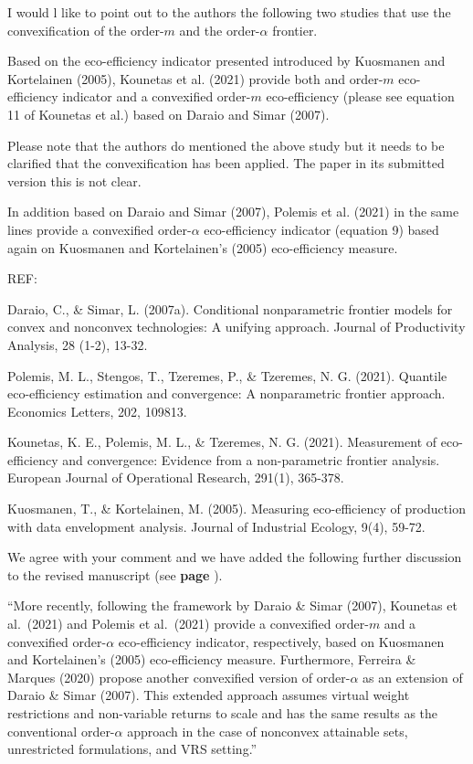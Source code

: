 \documentclass[12pt]{article}
\newcommand{\np}{\vskip 0.3cm}
\begin{document}
\np
\np
\np
\begin{sf}
{\blueb
I would l like to point out to the authors the following two studies that use the convexification of the order-$m$ and the order-$\alpha$ frontier.\np

Based on the eco-efficiency indicator presented introduced by Kuosmanen and Kortelainen (2005), Kounetas et al. (2021) provide both and order-$m$ eco-efficiency indicator and a convexified order-$m$ eco-efficiency (please see equation 11 of Kounetas et al.) based on  Daraio and Simar (2007).\np

Please note that the authors do mentioned the above study but it needs to be clarified that the convexification has been applied. The paper in its submitted version this is not clear.\np

In addition based on  Daraio and Simar (2007), Polemis et al. (2021) in the same lines provide a convexified order-$\alpha$ eco-efficiency indicator (equation 9) based again on Kuosmanen and Kortelainen's (2005) eco-efficiency measure. \np

REF:

Daraio, C., \& Simar, L. (2007a). Conditional nonparametric frontier models for convex and nonconvex technologies: A unifying approach. Journal of Productivity Analysis, 28 (1-2), 13-32.\np

Polemis, M. L., Stengos, T., Tzeremes, P., \& Tzeremes, N. G. (2021). Quantile eco-efficiency estimation and convergence: A nonparametric frontier approach. Economics Letters, 202, 109813.\np

Kounetas, K. E., Polemis, M. L., \& Tzeremes, N. G. (2021). Measurement of eco-efficiency and convergence: Evidence from a non-parametric frontier analysis. European Journal of Operational Research, 291(1), 365-378.\np

Kuosmanen, T., \& Kortelainen, M. (2005). Measuring eco-efficiency of production with data envelopment analysis. Journal of Industrial Ecology, 9(4), 59-72.}
\end{sf}
\begin{response}
We agree with your comment and we have added the following further discussion to the revised manuscript (see \textbf{page} ).\np

``More recently, following the framework by Daraio \& Simar (2007), Kounetas et al.~(2021) and Polemis et al.~(2021) provide a convexified order-$m$ and a convexified order-$\alpha$ eco-efficiency indicator, respectively, based on Kuosmanen and Kortelainen's (2005) eco-efficiency measure. Furthermore, Ferreira \& Marques (2020) propose another convexified version of order-$\alpha$ as an extension of Daraio \& Simar (2007). This extended approach assumes virtual weight restrictions and non-variable returns to scale and has the same results as the conventional order-$\alpha$ approach in the case of nonconvex attainable sets, unrestricted formulations, and VRS setting.''
\end{response}
\end{document}
